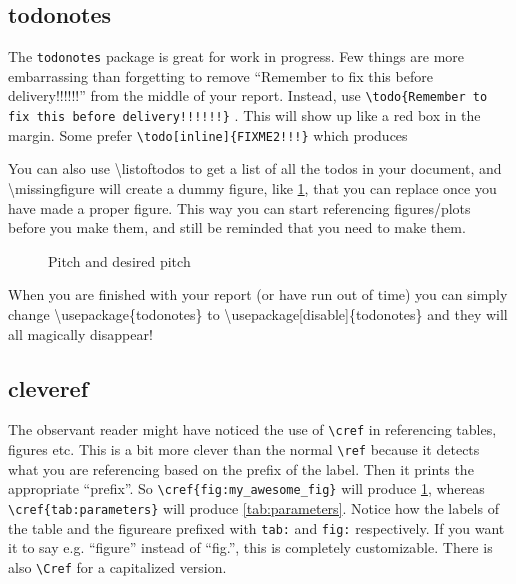  
 \subsection{todonotes}
 The \texttt{todonotes} package is great for work in progress. Few things are more embarrassing than forgetting to remove ``Remember to fix this before delivery!!!!!!'' from the middle of your report. Instead, use \texttt{\textbackslash{todo}\{Remember to fix this before delivery!!!!!!\}} . This will show up like a red box in the margin. Some prefer \texttt{\textbackslash{todo}{[inline]}\{FIXME2!!!\}} which produces  %

You can also use \textbackslash{listoftodos} to get a list of all the todos in your document, and \textbackslash{missingfigure} will create a dummy figure, like \cref{fig:my_awesome_fig}, that you can replace once you have made a proper figure. This way you can start referencing figures/plots before you make them, and still be reminded that you need to make them.

 \begin{figure}[h]
   \centering
   \caption{Pitch and desired pitch}
   \label{fig:my_awesome_fig}
\end{figure}
 
When you are finished with your report (or have run out of time) you can simply change \textbackslash{usepackage}\{todonotes\} to \textbackslash{usepackage}[disable]\{todonotes\} and they will all magically disappear!

\subsection{cleveref}
The observant reader might have noticed the use of \texttt{\textbackslash{cref}} in referencing tables, figures etc. This is a bit more clever than the normal \texttt{\textbackslash{ref}} because it detects what you are referencing based on the prefix of the label. Then it prints the appropriate ``prefix''. So \texttt{\textbackslash{cref}\{fig:my\_awesome\_fig\}} will produce \cref{fig:my_awesome_fig}, whereas \texttt{\textbackslash{cref}\{tab:parameters\}} will produce \cref{tab:parameters}. Notice how the labels of the table and the figureare prefixed with \texttt{tab:} and \texttt{fig:} respectively. If you want it to say e.g. ``figure'' instead of ``fig.'', this is completely customizable. There is also \texttt{\textbackslash{Cref}} for a capitalized version.
